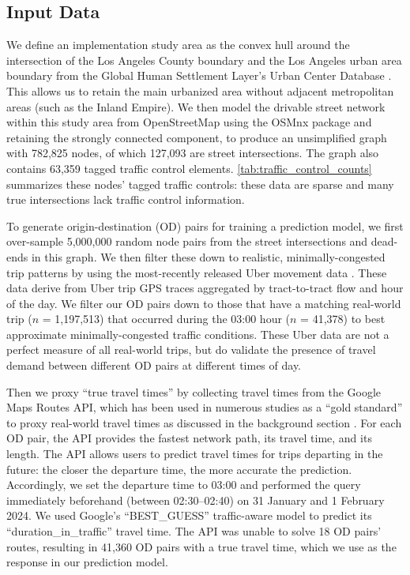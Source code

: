 \documentclass[12pt,letterpaper]{article} %
\begin{document}
\subsection{Input Data}

We define an implementation study area as the convex hull around the intersection of the Los Angeles County boundary and the Los Angeles urban area boundary from the Global Human Settlement Layer's Urban Center Database \citep{florczyk2019description, GHS2019}. This allows us to retain the main urbanized area without adjacent metropolitan areas (such as the Inland Empire). We then model the drivable street network within this study area from OpenStreetMap using the OSMnx package \citep{boeing_modeling_2025} and retaining the strongly connected component, to produce an unsimplified graph with 782,825 nodes, of which 127,093 are street intersections. The graph also contains 63,359 tagged traffic control elements. \autoref{tab:traffic_control_counts} summarizes these nodes' tagged traffic controls: these data are sparse and many true intersections lack traffic control information.

To generate origin-destination (OD) pairs for training a prediction model, we first over-sample 5,000,000 random node pairs from the street intersections and dead-ends in this graph. We then filter these down to realistic, minimally-congested trip patterns by using the most-recently released Uber movement data \citep{ubermovement2020}. These data derive from Uber trip GPS traces aggregated by tract-to-tract flow and hour of the day. We filter our OD pairs down to those that have a matching real-world trip ($n$ = 1,197,513) that occurred during the 03:00 hour ($n$ = 41,378) to best approximate minimally-congested traffic conditions. These Uber data are not a perfect measure of all real-world trips, but do validate the presence of travel demand between different OD pairs at different times of day.

Then we proxy \enquote{true travel times} by collecting travel times from the Google Maps Routes API, which has been used in numerous studies as a \enquote{gold standard} to proxy real-world travel times as discussed in the background section \citep[e.g.,][]{ludwig2023traffic, hu2020estimating, wang2011estimating, fu2023comparative, delmelle2019travel}. For each OD pair, the API provides the fastest network path, its travel time, and its length. The API allows users to predict travel times for trips departing in the future: the closer the departure time, the more accurate the prediction. Accordingly, we set the departure time to 03:00 and performed the query immediately beforehand (between 02:30--02:40) on 31 January and 1 February 2024. We used Google's \enquote{BEST\_GUESS} traffic-aware model to predict its \enquote{duration\_in\_traffic} travel time. The API was unable to solve 18 OD pairs' routes, resulting in 41,360 OD pairs with a true travel time, which we use as the response in our prediction model.
\end{document}
